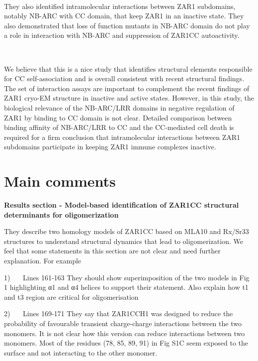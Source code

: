 \documentclass[10pt]{article}
\begin{document}
~

They also identified intramolecular interactions between ZAR1
subdomains, notably NB-ARC with CC domain, that keep ZAR1 in an inactive
state. They also demonstrated that loss of function mutants in NB-ARC
domain do not play a role in interaction with NB-ARC and suppression of
ZAR1CC autoactivity.

~

We believe that this is a nice study that identifies structural elements
responsible for CC self-association and is overall consistent with
recent structural findings. The set of interaction assays are important
to complement the recent findings of ZAR1 cryo-EM structure in inactive
and active states. However, in this study, the biological relevance of
the NB-ARC/LRR domains in negative regulation of ZAR1 by binding to CC
domain is not clear. Detailed comparison between binding affinity of
NB-ARC/LRR to CC and the CC-mediated cell death is required for a firm
conclusion that intramolecular interactions between ZAR1 subdomains
participate in keeping ZAR1 immune complexes inactive.

\section*{Main comments}

{\label{538864}}

\textbf{Results section - Model-based identification of ZAR1CC
structural determinants for oligomerization}

They describe two homology models of ZAR1CC based on MLA10 and Rx/Sr33
structures to understand structural dynamics that lead to
oligomerization. We feel that some statements in this section are not
clear and need further explanation. For example

1)~~~ Lines 161-163 They should show superimposition of the two models
in Fig 1 highlighting α1 and α4 helices to support their statement. Also
explain how t1 and t3 region are critical for oligomerisation

2)~~~ Lines 169-171 They say that ZAR1CCH1 was designed to reduce the
probability of favourable transient charge-charge interactions between
the two monomers. It is not clear how this version can reduce
interactions between two monomers. Most of the residues (78, 85, 89, 91)
in Fig S1C seem exposed to the surface and not interacting to the other
monomer.
\end{document}
